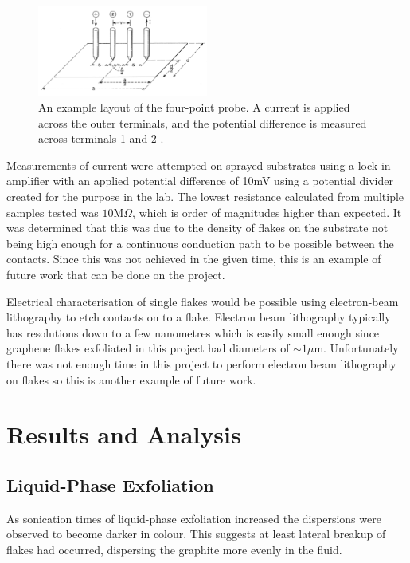 \documentclass[12pt,titlepage]{article}
\begin{document}
	\begin{figure}
		\centering
		\includegraphics[width=0.5\textwidth]{figures/probe.png}
		\caption[The four-point probe.]{An example layout of the four-point probe. A current is applied across the outer terminals, and the potential difference is measured across terminals 1 and 2 \cite{Smits1958}.}
		\label{fig:probe}
	\end{figure}

	Measurements of current were attempted on sprayed substrates using a lock-in amplifier with an applied potential difference of 10mV using a potential divider created for the purpose in the lab. The lowest resistance calculated from multiple samples tested was $10\text{M}\Omega$, which is order of magnitudes higher than expected. It was determined that this was due to the density of flakes on the substrate not being high enough for a continuous conduction path to be possible between the contacts. Since this was not achieved in the given time, this is an example of future work that can be done on the project.
	
	Electrical characterisation of single flakes would be possible using electron-beam lithography to etch contacts on to a flake. Electron beam lithography typically has resolutions down to a few nanometres which is easily small enough since graphene flakes exfoliated in this project had diameters of $\sim 1\mu$m. Unfortunately there was not enough time in this project to perform electron beam lithography on flakes so this is another example of	 future work.
	
	\newpage
	\section{Results and Analysis}
	\subsection{Liquid-Phase Exfoliation}
	As sonication times of liquid-phase exfoliation increased the dispersions were observed to become darker in colour. This suggests at least lateral breakup of flakes had occurred, dispersing the graphite more evenly in the fluid.
	
\end{document}
